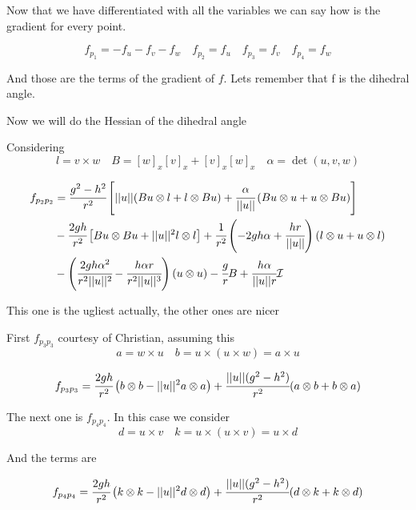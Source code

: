 \documentclass[11pt]{article}
\theoremstyle{plain}
\theoremstyle{definition}
\begin{document}
Now that we have differentiated with all the variables we can say how is the gradient for every point.


\begin{equation}
    f_{p_1} = -f_u-f_v-f_w \quad f_{p_2} = f_u \quad f_{p_3} = f_v \quad f_{p_4} = f_w
\end{equation}

And those are the terms of the gradient of $f$. Lets remember that f is the dihedral angle.

Now we will do the Hessian of the dihedral angle 


Considering  
\begin{equation}
 l = v\times w \quad B = [w]_x[v]_x + [v]_x[w]_x  \quad \alpha = \det(u,v,w)
\end{equation}

\begin{align}
    f_{p_2p_2}  &= \cfrac{g^2-h^2}{r^2} \left[ ||u|| (Bu \otimes l + l \otimes Bu ) + \cfrac{\alpha}{||u||}\left( Bu \otimes u + u \otimes Bu \right)    \right]\\
    &-\cfrac{2gh}{r^2}\left[ Bu\otimes Bu + ||u||^2 l \otimes l  \right] + \cfrac{1}{r^2}\left(-2gh\alpha + \cfrac{hr}{||u||}\right)\left(l\otimes u + u \otimes l \right)\\
    & - \left(\cfrac{2gh\alpha^2}{r^2 ||u||^2} - \cfrac{h\alpha r }{r^2 ||u||^3} \right)(u \otimes u) - \cfrac{g}{r}B + \cfrac{h\alpha }{||u|| r} \mathcal{I}
\end{align}


This one is the ugliest actually, the other ones are nicer 

First $f_{p_3p_3}$ courtesy of Christian, assuming this 
\begin{equation}
    a = w\times u \quad b = u \times (u\times w) = a\times u 
\end{equation}

\begin{align}
    f_{p_3p_3} = \cfrac{2gh }{r^2}\left(b\otimes b - ||u||^2 a\otimes a \right) + \cfrac{||u||(g^2-h^2)}{r^2} (a\otimes b + b\otimes a)
\end{align}


The next one is $f_{p_4p_4}$.
In this case we consider 
\begin{equation}
    d = u\times v \quad k = u \times (u\times v) = u\times d
\end{equation}

And the terms are 

\begin{align}
    f_{p_4p_4} = \cfrac{2gh}{r^2}\left(k\otimes k - ||u||^2 d\otimes d \right) + \cfrac{||u||(g^2-h^2)}{r^2} (d\otimes k + k\otimes d)
\end{align}
\end{document}
